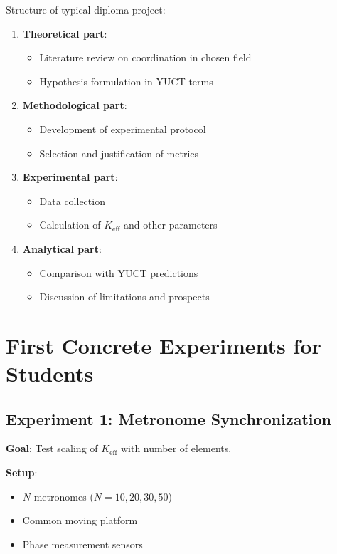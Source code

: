 \documentclass[12pt,a4paper]{article}
\begin{document}
	Structure of typical diploma project:
	\begin{enumerate}
		\item \textbf{Theoretical part}:
		\begin{itemize}
			\item Literature review on coordination in chosen field
			\item Hypothesis formulation in YUCT terms
		\end{itemize}
		
		\item \textbf{Methodological part}:
		\begin{itemize}
			\item Development of experimental protocol
			\item Selection and justification of metrics
		\end{itemize}
		
		\item \textbf{Experimental part}:
		\begin{itemize}
			\item Data collection
			\item Calculation of $K_{\mathrm{eff}}$ and other parameters
		\end{itemize}
		
		\item \textbf{Analytical part}:
		\begin{itemize}
			\item Comparison with YUCT predictions
			\item Discussion of limitations and prospects
		\end{itemize}
	\end{enumerate}
	
	\section{First Concrete Experiments for Students}
	
	\subsection{Experiment 1: Metronome Synchronization}
	
	\textbf{Goal}: Test scaling of $K_{\mathrm{eff}}$ with number of elements.
	
	\textbf{Setup}:
	\begin{itemize}
		\item $N$ metronomes ($N = 10, 20, 30, 50$)
		\item Common moving platform
		\item Phase measurement sensors
	\end{itemize}
	
\end{document}
